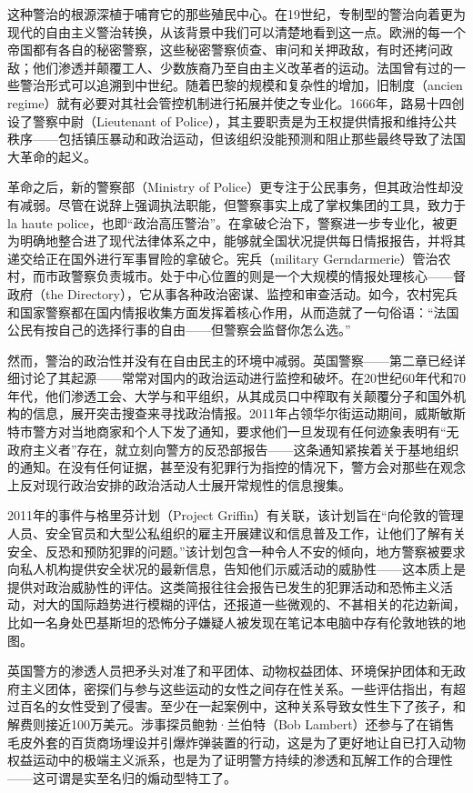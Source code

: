 \documentclass[fontset=fandol, a4paper, 12pt, openright]{ctexbook}
\begin{document}
这种警治的根源深植于哺育它的那些殖民中心。在19世纪，专制型的警治向着更为现代的自由主义警治转换，从该背景中我们可以清楚地看到这一点。欧洲的每一个帝国都有各自的秘密警察，这些秘密警察侦查、审问和关押政敌，有时还拷问政敌；他们渗透并颠覆工人、少数族裔乃至自由主义改革者的运动。法国曾有过的一些警治形式可以追溯到中世纪。随着巴黎的规模和复杂性的增加，旧制度（ancien regime）就有必要对其社会管控机制进行拓展并使之专业化。1666年，路易十四创设了警察中尉（Lieutenant of Police），其主要职责是为王权提供情报和维持公共秩序——包括镇压暴动和政治运动，但该组织没能预测和阻止那些最终导致了法国大革命的起义。

革命之后，新的警察部（Ministry of Police）更专注于公民事务，但其政治性却没有减弱。尽管在说辞上强调执法职能，但警察事实上成了掌权集团的工具，致力于la haute police，也即“政治高压警治”。在拿破仑治下，警察进一步专业化，被更为明确地整合进了现代法律体系之中，能够就全国状况提供每日情报报告，并将其递交给正在国外进行军事冒险的拿破仑。宪兵（military Gerndarmerie）管治农村，而市政警察负责城市。处于中心位置的则是一个大规模的情报处理核心——督政府（the Directory），它从事各种政治密谋、监控和审查活动。如今，农村宪兵和国家警察都在国内情报收集方面发挥着核心作用，从而造就了一句俗语：“法国公民有按自己的选择行事的自由——但警察会监督你怎么选。”

然而，警治的政治性并没有在自由民主的环境中减弱。英国警察——第二章已经详细讨论了其起源——常常对国内的政治运动进行监控和破坏。在20世纪60年代和70年代，他们渗透工会、大学与和平组织，从其成员口中榨取有关颠覆分子和国外机构的信息，展开突击搜查来寻找政治情报。2011年占领华尔街运动期间，威斯敏斯特市警方对当地商家和个人下发了通知，要求他们一旦发现有任何迹象表明有“无政府主义者”存在，就立刻向警方的反恐部报告——这条通知紧挨着关于基地组织的通知。在没有任何证据，甚至没有犯罪行为指控的情况下，警方会对那些在观念上反对现行政治安排的政治活动人士展开常规性的信息搜集。

2011年的事件与格里芬计划（Project Griffin）有关联，该计划旨在“向伦敦的管理人员、安全官员和大型公私组织的雇主开展建议和信息普及工作，让他们了解有关安全、反恐和预防犯罪的问题。”该计划包含一种令人不安的倾向，地方警察被要求向私人机构提供安全状况的最新信息，告知他们示威活动的威胁性——这本质上是提供对政治威胁性的评估。这类简报往往会报告已发生的犯罪活动和恐怖主义活动，对大的国际趋势进行模糊的评估，还报道一些微观的、不甚相关的花边新闻，比如一名身处巴基斯坦的恐怖分子嫌疑人被发现在笔记本电脑中存有伦敦地铁的地图。

英国警方的渗透人员把矛头对准了和平团体、动物权益团体、环境保护团体和无政府主义团体，密探们与参与这些运动的女性之间存在性关系。一些评估指出，有超过百名的女性受到了侵害。至少在一起案例中，这种关系导致女性生下了孩子，和解费则接近100万美元。涉事探员鲍勃·兰伯特（Bob Lambert）还参与了在销售毛皮外套的百货商场埋设并引爆炸弹装置的行动，这是为了更好地让自已打入动物权益运动中的极端主义派系，也是为了证明警方持续的渗透和瓦解工作的合理性——这可谓是实至名归的煽动型特工了。
\end{document}
